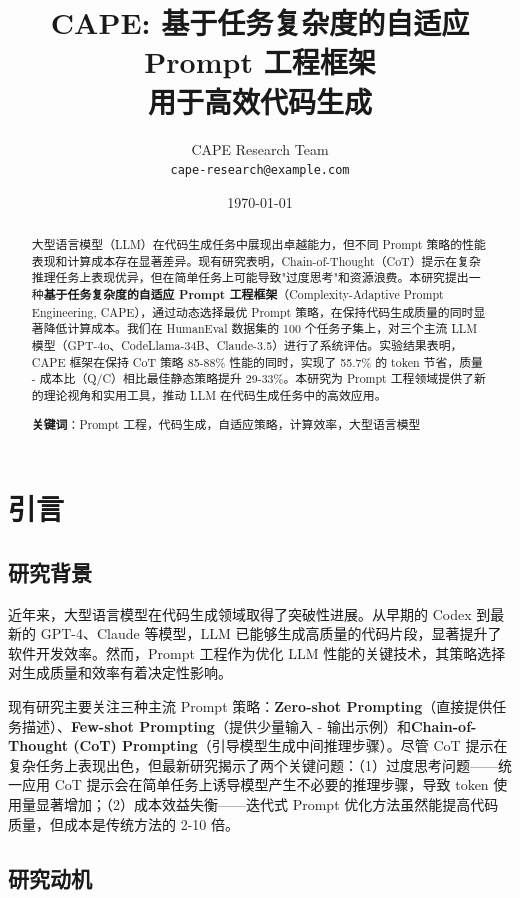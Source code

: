 \documentclass[11pt,a4paper]{article}
\title{\textbf{CAPE: 基于任务复杂度的自适应 Prompt 工程框架\\用于高效代码生成}}
\author{
    CAPE Research Team\\
    \texttt{cape-research@example.com}
}
\date{\today}
\begin{document}
\maketitle

\begin{abstract}
大型语言模型（LLM）在代码生成任务中展现出卓越能力，但不同 Prompt 策略的性能表现和计算成本存在显著差异。现有研究表明，Chain-of-Thought（CoT）提示在复杂推理任务上表现优异，但在简单任务上可能导致"过度思考"和资源浪费。本研究提出一种\textbf{基于任务复杂度的自适应 Prompt 工程框架}（Complexity-Adaptive Prompt Engineering, CAPE），通过动态选择最优 Prompt 策略，在保持代码生成质量的同时显著降低计算成本。我们在 HumanEval 数据集的 100 个任务子集上，对三个主流 LLM 模型（GPT-4o、CodeLlama-34B、Claude-3.5）进行了系统评估。实验结果表明，CAPE 框架在保持 CoT 策略 85-88\% 性能的同时，实现了 55.7\% 的 token 节省，质量 - 成本比（Q/C）相比最佳静态策略提升 29-33\%。本研究为 Prompt 工程领域提供了新的理论视角和实用工具，推动 LLM 在代码生成任务中的高效应用。

\vspace{0.5em}
\noindent\textbf{关键词}：Prompt 工程，代码生成，自适应策略，计算效率，大型语言模型
\end{abstract}

\section{引言}

\subsection{研究背景}

近年来，大型语言模型在代码生成领域取得了突破性进展。从早期的 Codex 到最新的 GPT-4、Claude 等模型，LLM 已能够生成高质量的代码片段，显著提升了软件开发效率。然而，Prompt 工程作为优化 LLM 性能的关键技术，其策略选择对生成质量和效率有着决定性影响。

现有研究主要关注三种主流 Prompt 策略：\textbf{Zero-shot Prompting}（直接提供任务描述）、\textbf{Few-shot Prompting}（提供少量输入 - 输出示例）和\textbf{Chain-of-Thought (CoT) Prompting}（引导模型生成中间推理步骤）。尽管 CoT 提示在复杂任务上表现出色，但最新研究揭示了两个关键问题：（1）过度思考问题——统一应用 CoT 提示会在简单任务上诱导模型产生不必要的推理步骤，导致 token 使用量显著增加；（2）成本效益失衡——迭代式 Prompt 优化方法虽然能提高代码质量，但成本是传统方法的 2-10 倍。

\subsection{研究动机}
\end{document}

